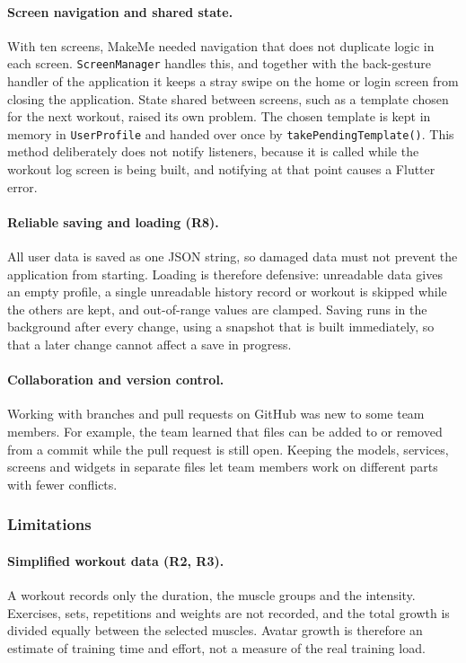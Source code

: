 \documentclass[11pt]{article}
\begin{document}
\paragraph{Screen navigation and shared state.}
With ten screens, MakeMe needed navigation that does not duplicate logic in each screen. \texttt{ScreenManager} handles this, and together with the back-gesture handler of the application it keeps a stray swipe on the home or login screen from closing the application. State shared between screens, such as a template chosen for the next workout, raised its own problem. The chosen template is kept in memory in \texttt{UserProfile} and handed over once by \texttt{takePendingTemplate()}. This method deliberately does not notify listeners, because it is called while the workout log screen is being built, and notifying at that point causes a Flutter error.

\paragraph{Reliable saving and loading (R8).}
All user data is saved as one JSON string, so damaged data must not prevent the application from starting. Loading is therefore defensive: unreadable data gives an empty profile, a single unreadable history record or workout is skipped while the others are kept, and out-of-range values are clamped. Saving runs in the background after every change, using a snapshot that is built immediately, so that a later change cannot affect a save in progress.

\paragraph{Collaboration and version control.}
Working with branches and pull requests on GitHub was new to some team members. For example, the team learned that files can be added to or removed from a commit while the pull request is still open. Keeping the models, services, screens and widgets in separate files let team members work on different parts with fewer conflicts.

\subsubsection{Limitations}

\paragraph{Simplified workout data (R2, R3).}
A workout records only the duration, the muscle groups and the intensity. Exercises, sets, repetitions and weights are not recorded, and the total growth is divided equally between the selected muscles. Avatar growth is therefore an estimate of training time and effort, not a measure of the real training load.
\end{document}
